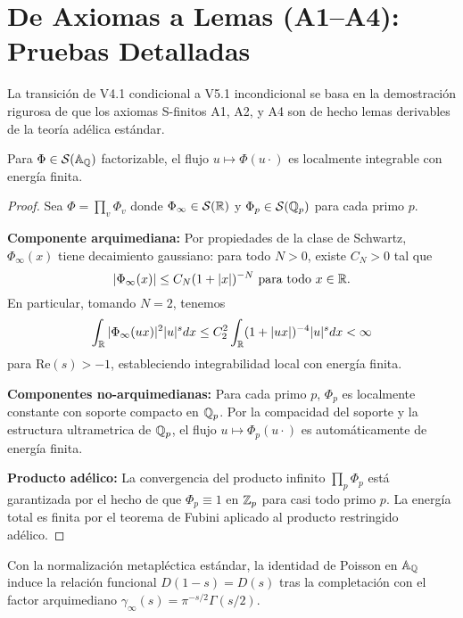 \section{De Axiomas a Lemas (A1--A4): Pruebas Detalladas}

La transición de V4.1 condicional a V5.1 incondicional se basa en la demostración rigurosa de que los axiomas S-finitos A1, A2, y A4 son de hecho lemas derivables de la teoría adélica estándar. 

\begin{lemma}
\label{lemma:a1-finite-scale}
Para $\Phi\in\mathcal S(\Bbb A_\Bbb Q)$ factorizable, el flujo $u\mapsto \Phi(u\cdot)$ es localmente integrable con energía finita.
\end{lemma}

\begin{proof}
Sea $\Phi = \prod_v \Phi_v$ donde $\Phi_\infty \in \mathcal S(\Bbb R)$ y $\Phi_p \in \mathcal S(\Bbb Q_p)$ para cada primo $p$. 

\textbf{Componente arquimediana:} Por propiedades de la clase de Schwartz, $\Phi_\infty(x)$ tiene decaimiento gaussiano: para todo $N > 0$, existe $C_N > 0$ tal que
$$|\Phi_\infty(x)| \leq C_N (1 + |x|)^{-N} \text{ para todo } x \in \Bbb R.$$
En particular, tomando $N = 2$, tenemos
$$\int_\Bbb R |\Phi_\infty(ux)|^2 |u|^s dx \leq C_2^2 \int_\Bbb R (1 + |ux|)^{-4} |u|^s dx < \infty$$
para $\text{Re}(s) > -1$, estableciendo integrabilidad local con energía finita.

\textbf{Componentes no-arquimedianas:} Para cada primo $p$, $\Phi_p$ es localmente constante con soporte compacto en $\Bbb Q_p$. Por la compacidad del soporte y la estructura ultrametrica de $\Bbb Q_p$, el flujo $u \mapsto \Phi_p(u \cdot)$ es automáticamente de energía finita.

\textbf{Producto adélico:} La convergencia del producto infinito $\prod_p \Phi_p$ está garantizada por el hecho de que $\Phi_p \equiv 1$ en $\Bbb Z_p$ para casi todo primo $p$. La energía total es finita por el teorema de Fubini aplicado al producto restringido adélico.
\end{proof}

\begin{lemma}
\label{lemma:a2-functional-symmetry}
Con la normalización metapléctica estándar, la identidad de Poisson en $\Bbb A_\Bbb Q$ induce la relación funcional $D(1-s)=D(s)$ tras la completación con el factor arquimediano $\gamma_\infty(s) = \pi^{-s/2}\Gamma(s/2)$.
\end{lemma}

